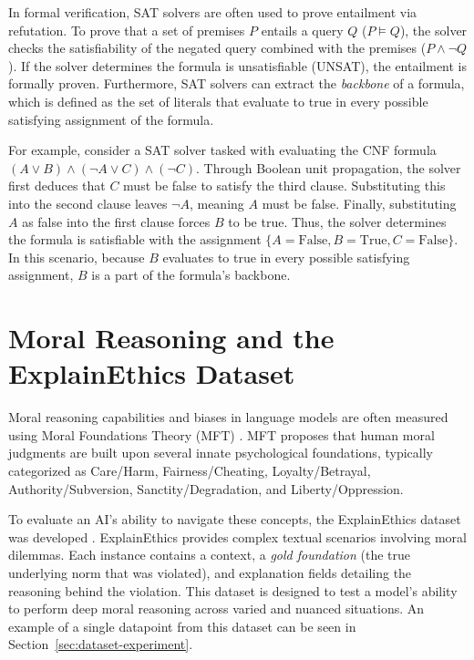 In formal verification, SAT solvers are often used to prove entailment via refutation. To prove that a set of premises $P$ entails a query $Q$ ($P \models Q$), the solver checks the satisfiability of the negated query combined with the premises ($P \land \neg Q$). If the solver determines the formula is unsatisfiable (UNSAT), the entailment is formally proven. Furthermore, SAT solvers can extract the \textit{backbone} of a formula, which is defined as the set of literals that evaluate to true in every possible satisfying assignment of the formula.

For example, consider a SAT solver tasked with evaluating the CNF formula $(A \lor B) \land (\neg A \lor C) \land (\neg C)$. Through Boolean unit propagation, the solver first deduces that $C$ must be false to satisfy the third clause. Substituting this into the second clause leaves $\neg A$, meaning $A$ must be false. Finally, substituting $A$ as false into the first clause forces $B$ to be true. Thus, the solver determines the formula is satisfiable with the assignment $\{A=\text{False}, B=\text{True}, C=\text{False}\}$. In this scenario, because $B$ evaluates to true in every possible satisfying assignment, $B$ is a part of the formula's backbone.


\section{Moral Reasoning and the ExplainEthics Dataset}
\label{sec:moralReasoning}
Moral reasoning capabilities and biases in language models are often measured using Moral Foundations Theory (MFT) \citep{abdulhai-etal-2024-moral, Ji2025MoralBench}. MFT proposes that human moral judgments are built upon several innate psychological foundations, typically categorized as Care/Harm, Fairness/Cheating, Loyalty/Betrayal, Authority/Subversion, Sanctity/Degradation, and Liberty/Oppression. 

To evaluate an AI's ability to navigate these concepts, the ExplainEthics dataset was developed \citep{quan2024enhancing}. ExplainEthics provides complex textual scenarios involving moral dilemmas. Each instance contains a context, a \textit{gold foundation} (the true underlying norm that was violated), and explanation fields detailing the reasoning behind the violation. This dataset is designed to test a model's ability to perform deep moral reasoning across varied and nuanced situations. An example of a single datapoint from this dataset can be seen in Section~\ref{sec:dataset-experiment}.

